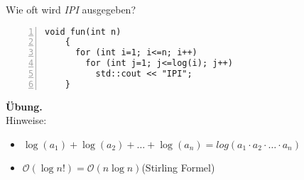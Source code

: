 \documentclass[aspectratio=169]{beamer}
\begin{document}
\begin{frame}[fragile]
  Wie oft wird \emph{IPI} ausgegeben?
  \begin{lstlisting}[numbers=left]
    void fun(int n) 
    { 
      for (int i=1; i<=n; i++) 
        for (int j=1; j<=log(i); j++) 
          std::cout << "IPI"; 
    }
  \end{lstlisting}
  \pause
  \textbf{Übung.}\\[2ex]
  Hinweise:
  \begin{itemize}
  \item $\log(a_1) + \log(a_2) + \dotsc + \log(a_n) = log(a_1 \cdot a_2 \cdot \dotsc \cdot a_n)$
  \item $\mathcal{O}(\log n!) = \mathcal{O}(n \log n)$\hfill(Stirling Formel)
  \end{itemize}
\end{frame}
\end{document}
